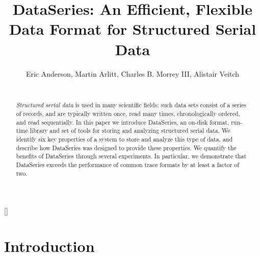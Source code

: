 \documentclass{acm_proc_article-sp}
\begin{document}
\newcommand{\DataSeries}{DataSeries}
\newcommand{\DS}{DS}

\title{DataSeries: An Efficient, Flexible Data Format for Structured Serial Data}
\author{
\alignauthor
Eric Anderson, Martin Arlitt, Charles B. Morrey III, Alistair Veitch  \\
  \\
}

\maketitle

\begin{abstract}
\textit{Structured serial data} is used in many scientific fields;
such data sets consist of a series of records, and are typically
written once, read many times, chronologically ordered, and read
sequentially.
In this paper we introduce DataSeries, an on-disk format,
run-time library and set of tools for storing and analyzing 
structured serial data.
We identify six key properties of a system to store and analyze
this type of data, and describe how DataSeries was designed
to provide these properties.  We quantify the benefits of DataSeries
through several experiments.  In particular, we demonstrate
that DataSeries exceeds the performance of common trace formats
by at least a factor of two.
\end{abstract}

[]
 


\section{Introduction}\label{sec:intro}
\end{document}
